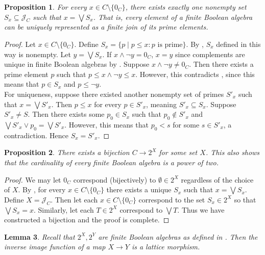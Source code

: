 \documentclass{article}
\newtheorem{proposition}{Proposition}[section]
\newtheorem{lemma}[proposition]{Lemma}
\numberwithin{equation}{section}
\newcommand{\meet}{\wedge}
\newcommand{\join}{\vee}
\newcommand{\bigjoin}{\bigvee}
\begin{document}
\begin{proposition} \label{prop:repr-bool-alg-with-primes}
For every $x \in C \setminus \{0_C\}$, there exists exactly one nonempty set $S_x \subseteq \mathcal{J}_C$ such that $x = \bigjoin S_x$. That is, every element of a finite Boolean algebra can be uniquely represented as a finite join of its prime elements.
\end{proposition}

\begin{proof}
Let $x \in C \setminus \{0_C\}$. Define $S_x = \{p \mid p \leq x : p \text{ is prime}\}$. By , $S_x$ defined in this way is nonempty. Let $y = \bigjoin S_x$. If $x \meet \neg y = 0_C$, $x = y$ since complements are unique in finite Boolean algebras by . Suppose $x \meet \neg y \neq 0_C$. Then there exists a prime element $p$ such that $p \leq x \meet \neg y \leq x$. However, this contradicts , since this means that $p \in S_x$ and $p \leq \neg y$. \\

For uniqueness, suppose there existed another nonempty set of primes $S'_x$ such that $x = \bigjoin S'_x$. Then $p \leq x$ for every $p \in S'_x$, meaning $S'_x \subseteq S_x$. Suppose $S'_x \neq S$. Then there exists some $p_0 \in S_x$ such that $p_0 \not\in S'_x$ and $\bigjoin S'_x \join p_0 = \bigjoin S'_x$. However, this means that $p_0 < s$ for some $s \in S'_x$, a contradiction. Hence $S_x = S'_x$.
\end{proof}

\begin{proposition}
There exists a bijection $C \to 2^X$ for some set $X$. This also shows that the cardinality of every finite Boolean algebra is a power of two. 
\end{proposition}

\begin{proof}
We may let $0_C$ correspond (bijectively) to $\emptyset \in 2^X$ regardless of the choice of $X$. By , for every $x \in C \setminus \{0_C\}$ there exists a unique $S_x$ such that $x = \bigjoin S_x$. Define $X = \mathcal{J}_C$. Then let each $x \in C \setminus \{0_C\}$ correspond to the set $S_x \in 2^X$ so that $\bigjoin S_x = x$. Similarly, let each $T \in 2^X$ correspond to $\bigjoin T$. Thus we have constructed a bijection and the proof is complete.
\end{proof}

\begin{lemma} \label{lem:inv-image-is-lattice-morphism}
Recall that $2^X, 2^Y$ are finite Boolean algebras as defined in . Then the inverse image function of a map $X \to Y$ is a lattice morphism.
\end{lemma}
\end{document}
